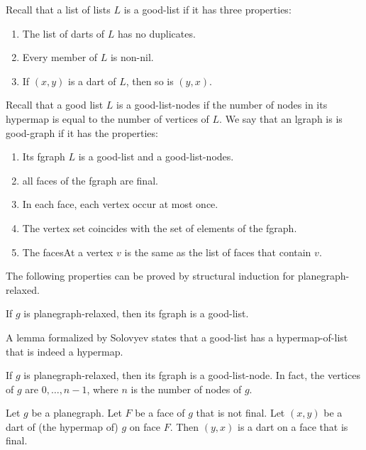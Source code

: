 \begin{definition}
Recall that a list of lists $L$ is a good-list if it has three properties:
\begin{enumerate}
\item The list of darts of $L$ has no duplicates.
\item Every member of $L$ is non-nil.
\item If $(x,y)$ is a dart of $L$, then so is $(y,x)$.
\end{enumerate}
Recall that a good list $L$ is a good-list-nodes if 
the number of nodes in its hypermap is equal to the number
of vertices of $L$.
We say that an lgraph is is good-graph if it has the properties:
\begin{enumerate}
\item Its fgraph $L$ is a good-list and a good-list-nodes.
\item all faces of the fgraph are final.
\item In each face, each vertex occur at most once.
\item The vertex set coincides with the set of elements of the fgraph.
\item The facesAt a vertex $v$ is the same as the list of faces that contain $v$.
\end{enumerate}
\end{definition}

The following properties can be proved by structural induction
for planegraph-relaxed.

\begin{lemma} 
If $g$ is planegraph-relaxed, then its fgraph is a good-list.
\end{lemma} 

A lemma formalized by Solovyev states that a good-list
has a hypermap-of-list that is indeed a hypermap.

\begin{lemma}
If $g$ is planegraph-relaxed, then its fgraph is a good-list-node.
In fact, the vertices of $g$ are $0,\ldots,n-1$, where
$n$ is the number of nodes of $g$. 
\end{lemma} 

\begin{lemma} 
Let $g$ be a planegraph.  Let $F$ be a face of $g$
that is not final.  Let $(x,y)$ be a dart of (the hypermap of) $g$ on face
$F$.
Then $(y,x)$ is a dart on a face that is final.
\end{lemma} 

